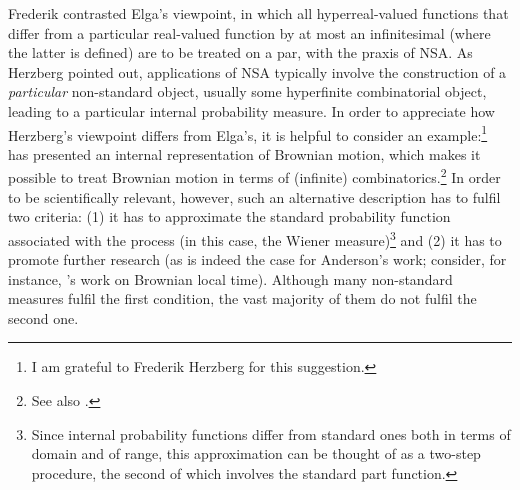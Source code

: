 Frederik \citet{Herzberg:2007a} contrasted Elga's viewpoint, in which all hyper\-real-valued functions that differ from a particular real-valued function by at most an infinitesimal (where the latter is defined) are to be treated on a par, with the praxis of NSA. As Herzberg pointed out, applications of NSA typically involve the construction of a \emph{particular} non-standard object, usually some hyperfinite combinatorial object, leading to a particular internal probability measure.
In order to appreciate how Herzberg's viewpoint differs from Elga's, it is helpful to consider an example:\footnote{I am grateful to Frederik Herzberg for this suggestion.} \citet{Anderson:1976} has presented an internal representation of Brownian motion, which makes it possible to treat Brownian motion in terms of (infinite) combinatorics.\footnote{See also \citet[section~3.3]{Albeverio_etal:1986}.} In order to be scientifically relevant, however, such an alternative description has to fulfil two criteria: (1) it has to approximate the standard probability function associated with the process (in this case, the Wiener measure)\footnote{Since internal probability functions differ from standard ones both in terms of domain and of range, this approximation can be thought of as a two-step procedure, the second of which involves the standard part function.} and (2) it has to promote further research (as is indeed the case for Anderson's work; consider, for instance, \citet{Perkins:1981}'s work on Brownian local time). Although many non-standard measures fulfil the first condition, the vast majority of them do not fulfil the second one.

